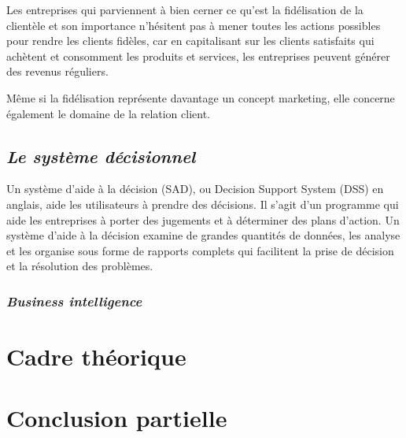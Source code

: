         Les entreprises qui parviennent à bien cerner ce qu’est la fidélisation
        de la clientèle et son importance n’hésitent pas à mener toutes les actions
        possibles pour rendre les clients fidèles, car en capitalisant sur les clients satisfaits
        qui achètent et consomment les produits et services, les entreprises peuvent générer des revenus réguliers.
        \newline

        Même si la fidélisation représente davantage un concept marketing,
        elle concerne également le domaine de la relation client.
        \subsection[Le système décisionnel]{\textit{Le système décisionnel}}
        Un système d’aide à la décision (SAD), ou Decision Support System (DSS)
        en anglais, aide les utilisateurs à prendre des décisions.
        Il s’agit d’un programme qui aide les entreprises à porter des jugements
        et à déterminer des plans d’action.
        Un système d’aide à la décision examine
        de grandes quantités de données, les analyse et les organise sous forme
        de rapports complets qui facilitent la prise de décision et
        la résolution des problèmes. \cite*{SAD}
            \subsubsection[Business intelligence]{\textit{Business intelligence}}
    \section[Cadre théorique]{Cadre théorique}
    \section[Conclusion partielle]{Conclusion partielle}